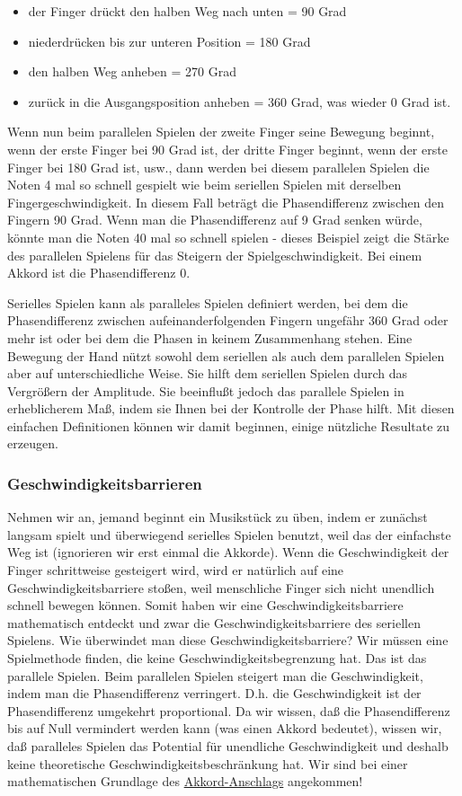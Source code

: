 \begin{itemize} 
 \item der Finger drückt den halben Weg nach unten = 90 Grad
 \item niederdrücken bis zur unteren Position = 180 Grad
 \item den halben Weg anheben = 270 Grad
 \item zurück in die Ausgangsposition anheben = 360 Grad, was wieder 0 Grad ist.
 \end{itemize}
Wenn nun beim parallelen Spielen der zweite Finger seine Bewegung beginnt, wenn der erste Finger bei 90 Grad ist, der dritte Finger beginnt, wenn der erste Finger bei 180 Grad ist, usw., dann werden bei diesem parallelen Spielen die Noten 4 mal so schnell gespielt wie beim seriellen Spielen mit derselben Fingergeschwindigkeit.
In diesem Fall beträgt die Phasendifferenz zwischen den Fingern 90 Grad.
Wenn man die Phasendifferenz auf 9 Grad senken würde, könnte man die Noten 40 mal so schnell spielen - dieses Beispiel zeigt die Stärke des parallelen Spielens für das Steigern der Spielgeschwindigkeit.
Bei einem Akkord ist die Phasendifferenz 0.

Serielles Spielen kann als paralleles Spielen definiert werden, bei dem die Phasendifferenz zwischen aufeinanderfolgenden Fingern ungefähr 360 Grad oder mehr ist oder bei dem die Phasen in keinem Zusammenhang stehen.
Eine Bewegung der Hand nützt sowohl dem seriellen als auch dem parallelen Spielen aber auf unterschiedliche Weise.
Sie hilft dem seriellen Spielen durch das Vergrößern der Amplitude.
Sie beeinflußt jedoch das parallele Spielen in erheblicherem Maß, indem sie Ihnen bei der Kontrolle der Phase hilft.
Mit diesen einfachen Definitionen können wir damit beginnen, einige nützliche Resultate zu erzeugen.


\subsubsection{Geschwindigkeitsbarrieren}
\label{c1iv2b}

Nehmen wir an, jemand beginnt ein Musikstück zu üben, indem er zunächst langsam spielt und überwiegend serielles Spielen benutzt, weil das der einfachste Weg ist (ignorieren wir erst einmal die Akkorde).
Wenn die Geschwindigkeit der Finger schrittweise gesteigert wird, wird er natürlich auf eine Geschwindigkeitsbarriere stoßen, weil menschliche Finger sich nicht unendlich schnell bewegen können.
Somit haben wir eine Geschwindigkeitsbarriere mathematisch entdeckt und zwar die Geschwindigkeitsbarriere des seriellen Spielens.
Wie überwindet man diese Geschwindigkeitsbarriere?
Wir müssen eine Spielmethode finden, die keine Geschwindigkeitsbegrenzung hat.
Das ist das parallele Spielen.
Beim parallelen Spielen steigert man die Geschwindigkeit, indem man die Phasendifferenz verringert.
D.h. die Geschwindigkeit ist der Phasendifferenz umgekehrt proportional.
Da wir wissen, daß die Phasendifferenz bis auf Null vermindert werden kann (was einen Akkord bedeutet), wissen wir, daß paralleles Spielen das Potential für unendliche Geschwindigkeit und deshalb keine theoretische Geschwindigkeitsbeschränkung hat.
Wir sind bei einer mathematischen Grundlage des \hyperref[c1ii9]{Akkord-Anschlags} angekommen!

